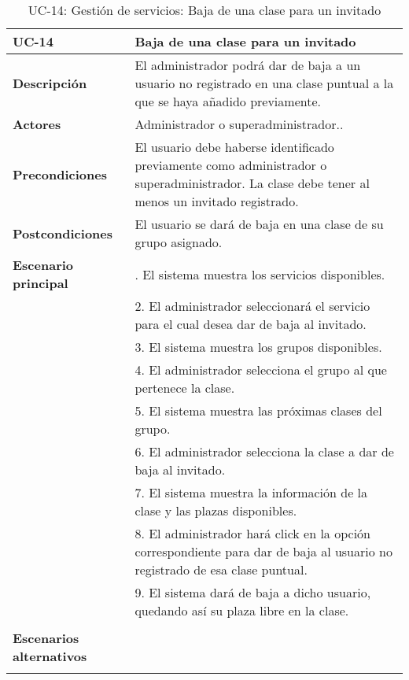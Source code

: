 \begin{table}[H]
  \begin{center}
    \begin{tabularx}{16.4cm}{|l|X|}
      \hline
      \textbf{UC-14} & \textbf{Baja de una clase para un invitado}\\
      \hline
      \textbf{Descripción} & El administrador podrá dar de baja a un usuario no registrado en una clase puntual a la que se haya añadido previamente. \\
      \hline
      \textbf{Actores} & Administrador o superadministrador..\\
      \hline
      \textbf{Precondiciones} & El usuario debe haberse identificado previamente como administrador o superadministrador. La clase debe tener al menos un invitado registrado.\\
      \hline
      \textbf{Postcondiciones} & El usuario se dará de baja en una clase de su grupo asignado.\\
      \hline
      \textbf{Escenario principal} & \smallskip 1. El sistema muestra los servicios disponibles.\\
      & 2. El administrador seleccionará el servicio para el cual desea dar de baja al invitado.\\
      & 3. El sistema muestra los grupos disponibles.\\
      & 4. El administrador selecciona el grupo al que pertenece la clase. \\
      & 5. El sistema muestra las próximas clases del grupo.\\
      & 6. El administrador selecciona la clase a dar de baja al invitado.\\
      & 7. El sistema muestra la información de la clase y las plazas disponibles.\\
      & 8. El administrador hará click en la opción correspondiente para dar de baja al usuario no registrado de esa clase puntual.\\
      & 9. El sistema dará de baja a dicho usuario, quedando así su plaza libre en la clase. \\
      & \\
      \hline
      \textbf{Escenarios alternativos} & \\
      & \\
      \hline
    \end{tabularx}
    \caption{UC-14: Gestión de servicios: Baja de una clase para un invitado}
  \end{center}
\end{table}


